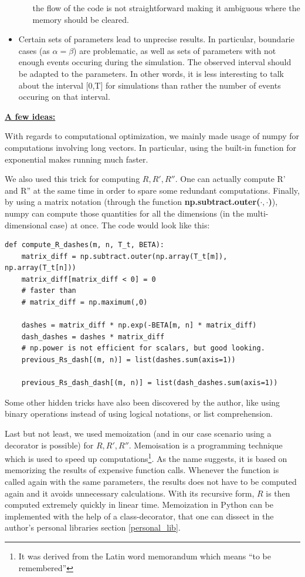 \documentclass[11pt]{book}
\begin{document}
\begin{itemize}
\begin{enumerate}
the flow of the code is not straightforward making it ambiguous where the memory should be cleared.
\end{enumerate}
\item Certain sets of parameters lead to unprecise results. In particular, boundarie cases (as $\alpha = \beta$) are problematic, as well as sets of parameters with not enough events occuring during the simulation. The observed interval should be adapted to the parameters. In other words, it is less interesting to talk about the interval [0,T] for simulations than rather the number of events occuring on that interval.
\end{itemize}

\underline{\textbf{A few ideas:}}

With regards to computational optimization, we mainly made usage of numpy for computations involving long vectors. In particular, using the built-in function for exponential makes running much faster. 

We also used this trick for computing $R,R',R''$. One can actually compute R' and R'' at the same time in order to spare some redundant computations. Finally, by using a matrix notation (through the function \textbf{np.subtract.outer($\cdot,\cdot$)}), numpy can compute those quantities for all the dimensions (in the multi-dimensional case) at once. The code would look like this:

\begin{verbatim}
def compute_R_dashes(m, n, T_t, BETA):
    matrix_diff = np.subtract.outer(np.array(T_t[m]), np.array(T_t[n]))
    matrix_diff[matrix_diff < 0] = 0
    # faster than
    # matrix_diff = np.maximum(,0)

    dashes = matrix_diff * np.exp(-BETA[m, n] * matrix_diff)
    dash_dashes = dashes * matrix_diff
    # np.power is not efficient for scalars, but good looking.
    previous_Rs_dash[(m, n)] = list(dashes.sum(axis=1))

    previous_Rs_dash_dash[(m, n)] = list(dash_dashes.sum(axis=1))
\end{verbatim}

Some other hidden tricks have also been discovered by the author, like using binary operations instead of using logical notations, or list comprehension.

Last but not least, we used memoization (and in our case scenario using a decorator is possible) for $R,R',R''$. Memoisation is a programming technique which is used to speed up computations\footnote{It was derived from the Latin word memorandum which means “to be remembered”}. As the name suggests, it is based on memorizing the results of expensive function calls. Whenever the function is called again with the same parameters, the results does not have to be computed again and it avoids unnecessary calculations. With its recursive form, $R$ is then computed extremely quickly in linear time. Memoization in Python can be implemented with the help of a class-decorator, that one can dissect in the author's personal libraries section \ref{personal_lib}. 
\end{document}
